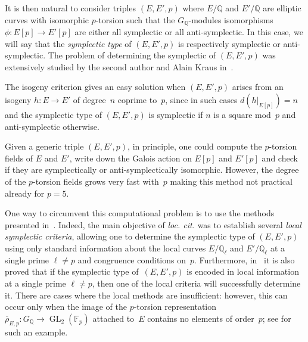 \documentclass[12pt, reqno]{amsart}
\newcommand{\F}{\mathbb{F}}
\newcommand{\Q}{\mathbb{Q}}
\newcommand{\Z}{\mathbb{Z}}
\newcommand{\rhobar}{{\overline{\rho}}}
\newcommand{\GL}{\operatorname{GL}}
\numberwithin{equation}{section}
\theoremstyle{definition}
\theoremstyle{remark}
\begin{document}
\begin{comment}
both have $5$-torsion Galois module isomorphic to $\mu_5
\times \Z/5\Z$.  Now let $P,Q \in E[5]$ and $P',Q' \in E'[5]$ be bases
such that $P$, $P'$ are defined over~$\Q$.  The map defined by $P
\mapsto P'$ and $Q \mapsto n\cdot Q'$ (with $5 \nmid n$) is a
$G_\Q$-isomorphism which is symplectic if and only if $n$ is a square
mod~$5$.  Moreover, the automorphism $\alpha$ of $E[5]$ given by
$\alpha(P) = P$ and $\alpha(Q) = 2Q$ is anti-symplectic because $2$ is
not a square modulo~$5$.
\end{comment}

It is then natural to consider triples $(E,E',p)$ where $E/\Q$ and $E'/\Q$ are elliptic
curves with isomorphic $p$-torsion such that the $G_\Q$-modules
isomorphisms $\phi : E[p] \rightarrow E'[p]$ are either all symplectic
or all anti-symplectic.  In this case, we will say that the {\em
  symplectic type} of $(E,E',p)$ is respectively symplectic or
anti-symplectic.  The problem of determining the symplectic of
$(E,E',p)$ was extensively studied by the second author and Alain
Kraus in~\cite{FKSym}.

The isogeny criterion gives an easy solution when $(E,E',p)$
arises from an isogeny $h \colon E \to E'$ of degree~$n$ coprime
to~$p$, since in such cases $d(h|_{E[p]}) = n$ and the symplectic type
of $(E,E',p)$ is symplectic if $n$ is a square mod~$p$ and
anti-symplectic otherwise.

Given a generic triple $(E, E', p)$, in principle, one
could compute the $p$-torsion fields of $E$ and $E'$,
write down the Galois action on $E[p]$ and $E'[p]$ and check if they
are symplectically or anti-symplectically isomorphic. However, the
degree of the $p$-torsion fields grows very fast with~$p$ making this
method not practical already for $p = 5$.

One way to circumvent this computational problem is to use the methods
presented in~\cite{FKSym}. Indeed, the main objective of {\it
  loc. cit.} was to establish several {\em local symplectic criteria},
allowing one to determine the symplectic type of $(E,E',p)$ using only
standard information about the local curves $E/\Q_\ell$ and
$E'/\Q_\ell$ at a single prime $\ell \neq p$ and congruence conditions
on~$p$. Furthermore, in~\cite{FKSym} it is also proved that if the
symplectic type of~$(E,E',p)$ is encoded in local information at a
single prime $\ell \neq p$, then one of the local criteria will
successfully determine it.  
There are cases where the local methods
are insufficient: however, this can occur only when the image
of the $p$-torsion representation~$\rhobar_{E,p} : G_\Q \to \GL_2(\F_p)$ attached to~$E$ contains no elements of order~$p$;
see \cite[Proposition~16]{FKSym} for such an example.
\end{document}
